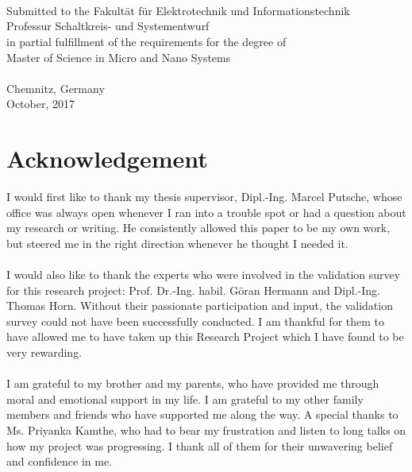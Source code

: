 \documentclass[a4paper,11pt]{article}
\begin{document}
\ \\
\ \\
\ \\
\begin{center}

Submitted to the Fakultät für Elektrotechnik und Informationstechnik\\
Professur Schaltkreis- und Systementwurf\\
in partial fulfillment of the requirements for the degree of\\
Master of Science in Micro and Nano Systems\\
\ \\
Chemnitz, Germany\\
October, 2017\\
\end{center}

\pagebreak
\section*{\LARGE{Acknowledgement}}

I would first like to thank my thesis supervisor, Dipl.-Ing. Marcel Putsche, whose office was always open whenever I ran into a trouble spot or had a question about my research or writing. He consistently allowed this paper to be my own work, but steered me in the right direction whenever he thought I needed it.\\
\ \\
I would also like to thank the experts who were involved in the validation survey for this research project: Prof. Dr.-Ing. habil. Göran Hermann and Dipl.-Ing. Thomas Horn. Without their passionate participation and input, the validation survey could not have been successfully conducted. I am thankful for them to have allowed me to have taken up this Research Project which I have found to be very rewarding.\\
\ \\
I am grateful to my brother and my parents, who have provided me through moral and emotional support in my life. I am grateful to my other family members and friends who have supported me along the way. A special thanks to Ms. Priyanka Kamthe, who had to bear my frustration and listen to long talks on how my project was progressing. I thank all of them for their unwavering belief and confidence in me.\\
\ \\
\end{document}
